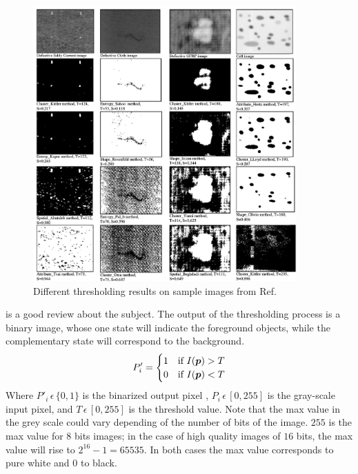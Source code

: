 \begin{figure}[h]
\begin{center}
\includegraphics[width=0.9\textwidth,
height=0.6\textwidth]{Figures/chapter-image/fig_threshold_image.png}

\caption[Threshold calculation by different methods]{Different thresholding
results on sample images from Ref.\citep{sezgin_survey_2004}}
\label{fig:threshold}
\end{center}
\end{figure}

\citet{sezgin_survey_2004} is a good review about the subject. The output of the
thresholding process is a binary image, whose one state will indicate the
foreground objects, while the complementary state will correspond to the
background.\\
\begin{equation}
P'_i=
   \begin{cases} 
     1               & \mbox{if } I(\boldsymbol{p}) > T   \\
     0               & \mbox{if } I(\boldsymbol{p}) < T
   \end{cases}
   \label{eq:bin}
\end{equation}
Where $P'_i\,\epsilon \, \{0{,} 1\}$ is the binarized output pixel , $P_i\,
\epsilon \,[0{,}255]$ is the gray-scale input pixel, and $T\,
\epsilon \,[0{,}255]$ is the threshold value. Note that the max value in the
grey scale could vary depending of the number of bits of the image. $255$ is
the max value for $8$ bits images;
in the case of high quality images of $16$ bits, the max value will rise to
$2^{16} - 1 = 65535$. In both cases the max value corresponds to pure white and
$0$ to black.

